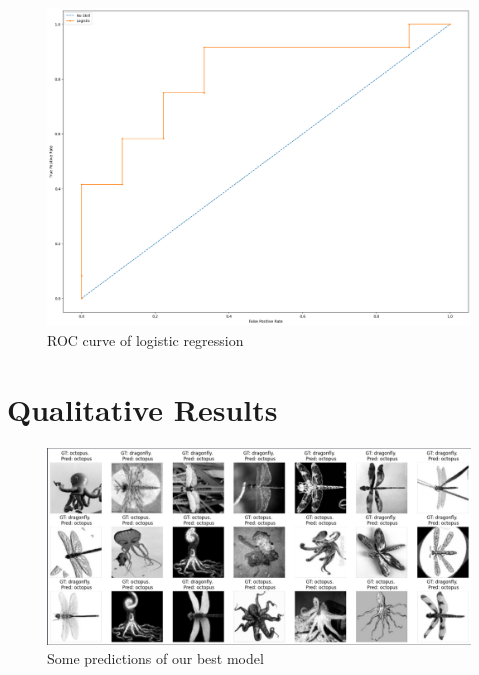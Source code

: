 \documentclass{thesisreport}
\begin{document}
\begin{figure}[H]
    \centering
    \includegraphics[width=0.7\linewidth]{figures/logistic_roc.png}
    \caption{ROC curve of logistic regression}
    \label{fig:roc-logistic}
\end{figure}

\section{Qualitative Results}

\begin{figure}[H]
    \centering
    \includegraphics[width=1\linewidth]{figures/best_pred.png}
    \caption{Some predictions of our best model}
    \label{fig:best-pred}
\end{figure}


 






\end{document}
